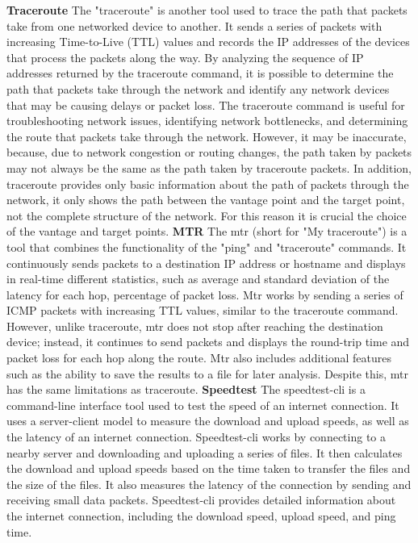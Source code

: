 \documentclass[eng]{class}
\begin{document}
\noindent
\textbf{Traceroute} \newline
The "traceroute" is another tool used to trace the path that packets take from one networked device to another.
It sends a series of packets with increasing Time-to-Live (TTL) values and records the IP addresses of the devices that process the packets along the way.
By analyzing the sequence of IP addresses returned by the traceroute command,
it is possible to determine the path that packets take through the network and identify any network devices that may be causing delays or packet loss.
The traceroute command is useful for troubleshooting network issues, identifying network bottlenecks, and determining the route that packets take through the network.
However, it may be inaccurate, because, due to network congestion or routing changes,
the path taken by packets may not always be the same as the path taken by traceroute packets.
In addition, traceroute provides only basic information about the path of packets through the network,
it only shows the path between the vantage point and the target point, not the complete structure of the network.
For this reason it is crucial the choice of the vantage and target points.\newline
\newline
\textbf{MTR} \newline
The mtr (short for "My traceroute") is a tool that combines the functionality of the "ping" and "traceroute" commands.
It continuously sends packets to a destination IP address or hostname and displays  in real-time
different statistics, such as average and standard deviation of the latency for each hop, percentage of packet loss.
Mtr works by sending a series of ICMP packets with increasing TTL values, similar to the traceroute command.
However, unlike traceroute, mtr does not stop after reaching the destination device; instead,
it continues to send packets and displays the round-trip time and packet loss for each hop along the route.
Mtr also includes additional features such as the ability to save the results to a file for later analysis.
Despite this, mtr has the same limitations as traceroute.\newline
\newline
\textbf{Speedtest} \newline
The speedtest-cli is a command-line interface tool used to test the speed of an internet connection.
It uses a server-client model to measure the download and upload speeds, as well as the latency of an internet connection.
Speedtest-cli works by connecting to a nearby server and downloading and uploading a series of files.
It then calculates the download and upload speeds based on the time taken to transfer the files and the size of the files.
It also measures the latency of the connection by sending and receiving small data packets.
Speedtest-cli provides detailed information about the internet connection, including the download speed, upload speed, and ping time.
\end{document}
